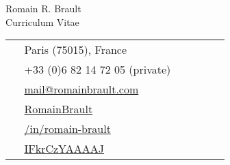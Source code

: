 \documentclass[10pt]{article} %
\begin{document}
\begin{paracol}{2} %
%
%
\parbox[top][0.12\textheight][c]{\linewidth}{ %
    \vspace{-0.04\textheight} %
    \centering %
    {\sffamily\Huge Romain R. Brault}\\\medskip %
    {\Huge\color{headings}\cvtextfont Curriculum Vitae}
}
\switchcolumn %
%
%
\parbox[top][0.12\textheight][c]{\linewidth}{ %
    \vspace{-0.04\textheight} %
    \colorbox{shade}{ %
        \begin{supertabular}{p{0.05\linewidth}|p{0.775\linewidth}} %
            \raisebox{-1pt}{\faHome} &
                Paris (75015),
                France\\ %
            \raisebox{-1pt}{\faPhone} & +33 (0)6 82 14 72 05 (private) \\
            \raisebox{0pt}{\small\faEnvelope} &
                \href{mailto:mail@romainbrault.com}{ %
                      mail@romainbrault.com} \\ %
            \raisebox{-1pt}{\faGithub} &
                \href{https://github.com/RomainBrault}{ %
                      RomainBrault} \\ %
            \raisebox{-1pt}{\faLinkedinSquare} &
                \href{https://www.linkedin.com/in/romain-brault}{ %
                      /in/romain-brault} \\ %
            \raisebox{-1pt}{\faGraduationCap} &
                \href{https://scholar.google.fr/citations?user=IFkrCzYAAAAJ}{ %
                IFkrCzYAAAAJ} \\
        \end{supertabular}
    }
}
\end{paracol}
\end{document}

